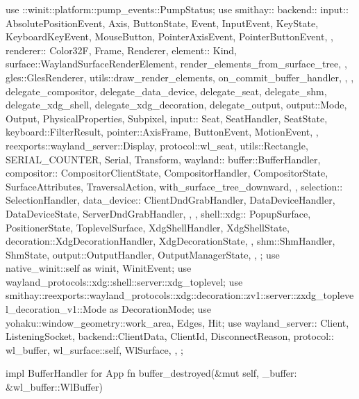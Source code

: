 use ::winit::platform::pump_events::PumpStatus;
use smithay::{
    backend::{
        input::{
            AbsolutePositionEvent, Axis, ButtonState, Event, InputEvent, KeyState,
            KeyboardKeyEvent, MouseButton, PointerAxisEvent, PointerButtonEvent,
        },
        renderer::{
            Color32F, Frame, Renderer,
            element::{
                Kind,
                surface::{WaylandSurfaceRenderElement, render_elements_from_surface_tree},
            },
            gles::GlesRenderer,
            utils::{draw_render_elements, on_commit_buffer_handler},
        },
    },
    delegate_compositor, delegate_data_device, delegate_seat, delegate_shm, delegate_xdg_shell,
    delegate_xdg_decoration,
    delegate_output,
    output::{Mode, Output, PhysicalProperties, Subpixel},
    input::{
        Seat, SeatHandler, SeatState,
        keyboard::FilterResult,
        pointer::{AxisFrame, ButtonEvent, MotionEvent},
    },
    reexports::wayland_server::{Display, protocol::wl_seat},
    utils::{Rectangle, SERIAL_COUNTER, Serial, Transform},
    wayland::{
        buffer::BufferHandler,
        compositor::{
            CompositorClientState, CompositorHandler, CompositorState, SurfaceAttributes,
            TraversalAction, with_surface_tree_downward,
        },
        selection::{
            SelectionHandler,
            data_device::{
                ClientDndGrabHandler, DataDeviceHandler, DataDeviceState, ServerDndGrabHandler,
            },
        },
        shell::xdg::{
            PopupSurface, PositionerState, ToplevelSurface, XdgShellHandler, XdgShellState,
            decoration::{XdgDecorationHandler, XdgDecorationState},
        },
        shm::{ShmHandler, ShmState},
        output::{OutputHandler, OutputManagerState},
    },
};
use native_winit::{self as winit, WinitEvent};
use wayland_protocols::xdg::shell::server::xdg_toplevel;
use smithay::reexports::wayland_protocols::xdg::decoration::zv1::server::zxdg_toplevel_decoration_v1::Mode as DecorationMode;
use yohaku::window_geometry::{work_area, Edges, Hit};
use wayland_server::{
    Client, ListeningSocket,
    backend::{ClientData, ClientId, DisconnectReason},
    protocol::{
        wl_buffer,
        wl_surface::{self, WlSurface},
    },
};

impl BufferHandler for App {
    fn buffer_destroyed(&mut self, _buffer: &wl_buffer::WlBuffer) {}
}

